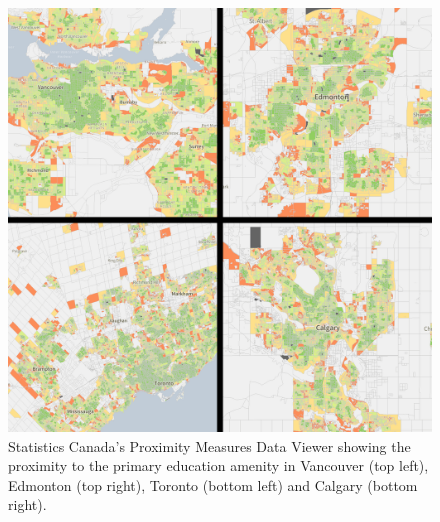 \documentclass[11pt, a4paper]{article}
\begin{document}
\begin{figure}[H]
\centering
\includegraphics[width=\textwidth]{./PMD_viewer/PMD_viewer2.png}
\caption[Proximity Measures Data Viewer]{Statistics Canada’s Proximity Measures Data Viewer showing the proximity to the primary education amenity in Vancouver (top left), Edmonton (top right), Toronto (bottom left) and Calgary (bottom right).}\label{pmdviewer}
\end{figure}
\end{document}
